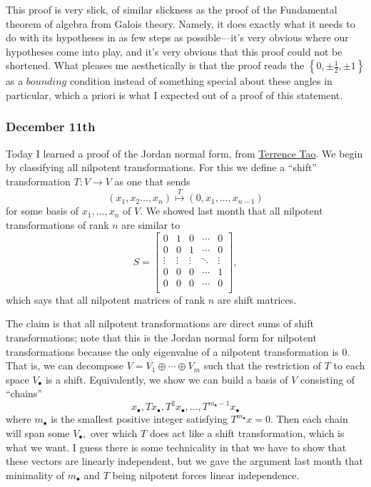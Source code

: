 This proof is very slick, of similar slickness as the proof of the Fundamental theorem of algebra from Galois theory. Namely, it does exactly what it needs to do with its hypotheses in as few steps as possible---it's very obvious where our hypotheses come into play, and it's very obvious that this proof could not be shortened. What pleases me aesthetically is that the proof reads the $\left\{0,\pm\frac12,\pm1\right\}$ as a $\textit{bounding}$ condition instead of something special about these angles in particular, which a priori is what I expected out of a proof of this statement.

\subsubsection{December 11th}
Today I learned a proof of the Jordan normal form, from \href{https://terrytao.wordpress.com/2007/10/12/the-jordan-normal-form-and-the-euclidean-algorithm/}{Terrence Tao}. We begin by classifying all nilpotent transformations. For this we define a ``shift'' transformation $T:V\to V$ as one that sends 
\[(x_1,x_2\ldots,x_n)\stackrel T\longmapsto(0,x_1,\ldots,x_{n-1})\]
for some basis of $x_1,\ldots,x_n$ of $V.$ We showed last month that all nilpotent transformations of rank $n$ are similar to
\[S=\begin{bmatrix}
    0 & 1 & 0 & \cdots & 0 \\
    0 & 0 & 1 & \cdots & 0 \\
    \vdots & \vdots & \vdots & \ddots & \vdots \\
    0 & 0 & 0 & \cdots & 1 \\
    0 & 0 & 0 & \cdots & 0 \\
\end{bmatrix},\]
which says that all nilpotent matrices of rank $n$ are shift matrices.

The claim is that all nilpotent transformations are direct sums of shift transformations; note that this is the Jordan normal form for nilpotent transformations because the only eigenvalue of a nilpotent transformation is $0.$ That is, we can decompose $V=V_1\oplus\cdots\oplus V_m$ such that the restriction of $T$ to each space $V_\bullet$ is a shift. Equivalently, we show we can build a basis of $V$ consisting of ``chains''
\[x_\bullet,Tx_\bullet,T^2x_\bullet,\ldots,T^{m_\bullet-1}x_\bullet\]
where $m_\bullet$ is the smallest positive integer satisfying $T^{m_\bullet}x=0.$ Then each chain will span some $V_\bullet,$ over which $T$ does act like a shift transformation, which is what we want. I guess there is some technicality in that we have to show that these vectors are linearly independent, but we gave the argument last month that minimality of $m_\bullet$ and $T$ being nilpotent forces linear independence.

